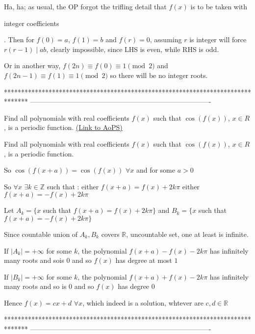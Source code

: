 \begin{solution}
	Ha, ha; as usual, the OP forgot the trifling detail that $f(x)$ is to be taken with\begin{bolded} integer coefficients\end{bolded}. Then for $f(0) = a$, $f(1) = b$ and $f(r) = 0$, assuming $r$ is integer will force $r(r-1) \mid ab$, clearly impossible, since LHS is even, while RHS is odd.
\end{solution}



\begin{solution}
	Or in another way, $f(2n)\equiv f(0) \equiv 1 \pmod 2$ and $f(2n-1)\equiv f(1) \equiv 1 \pmod 2$ so there will be no integer roots.
\end{solution}
*******************************************************************************
-------------------------------------------------------------------------------

\begin{problem}
	Find all polynomials with real coefficients $f(x)$ such that $\cos(f(x))$, $x{\in}R$, is a periodic function.
	\flushright \href{https://artofproblemsolving.com/community/c6h563624}{(Link to AoPS)}
\end{problem}



\begin{solution}
	\begin{tcolorbox}Find all polynomials with real coefficients $f(x)$ such that $\cos(f(x))$, $x{\in}R$, is a periodic function.\end{tcolorbox}
So $\cos(f(x+a))=\cos(f(x))$ $\forall x$ and for some $a>0$

So $\forall x$ $\exists k\in\mathbb Z$ such that :
either $f(x+a)=f(x)+2k\pi$
either $f(x+a)=-f(x)+2k\pi$

Let $A_k=\{x$ such that $f(x+a)=f(x)+2k\pi\}$ and $B_k=\{x$ such that $f(x+a)=-f(x)+2k\pi\}$

Since countable union of $A_k,B_k$ covers $\mathbb R$, uncountable set, one at least is infinite.

If $|A_k|=+\infty$ for some $k$, the polynomial $f(x+a)-f(x)-2k\pi$ has infinitely many roots and sois $0$ and so  $f(x)$ has degree at most $1$

If $|B_k|=+\infty$ for some $k$, the polynomial $f(x+a)+f(x)-2k\pi$ has infinitely many roots and so is $0$ and so $f(x)$ has degree $0$

Hence $\boxed{f(x)=cx+d}$ $\forall x$, which indeed is a solution, whtever are $c,d\in\mathbb R$
\end{solution}
*******************************************************************************
-------------------------------------------------------------------------------

